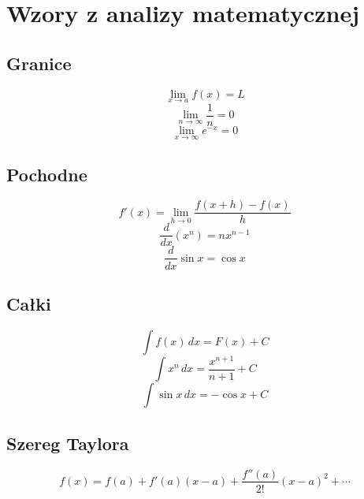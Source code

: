 \documentclass{article}
\begin{document}
\section*{Wzory z analizy matematycznej}

\subsection*{Granice}

\[
    \lim_{x \to a} f(x) = L 
\]
\[
    \lim_{n \to \infty} \frac{1}{n} = 0 
\]
\[
    \lim_{x \to \infty} e^{-x} = 0
\]

\subsection*{Pochodne}

\[
    f'(x) = \lim_{h \to 0} \frac{f(x+h) - f(x)}{h} 
\]
\[
    \frac{d}{dx} (x^n) = nx^{n-1} 
\]
\[
    \frac{d}{dx} \sin x = \cos x
\]

\subsection*{Całki}

\[
    \int f(x) \,dx = F(x) + C 
\]
\[
    \int x^n \,dx = \frac{x^{n+1}}{n+1} + C 
\]
\[
    \int \sin x \,dx = -\cos x + C
\]

\subsection*{Szereg Taylora}

\[
    f(x) = f(a) + f'(a)(x-a) + \frac{f''(a)}{2!}(x-a)^2 + \cdots
\]
\end{document}
